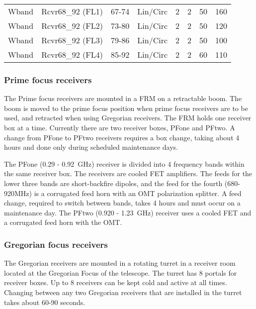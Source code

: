 \begin{table}[!h]
\begin{center}
\begin{tabular}{llcccccc}
\gls{Wband} & Rcvr68\_92 (FL1)   & 67-74     & Lin/Circ & 2 & 2 & 50  & 160 \\ 
\gls{Wband} & Rcvr68\_92 (FL2)   & 73-80     & Lin/Circ & 2 & 2 & 50  & 120 \\ 
\gls{Wband} & Rcvr68\_92 (FL3)   & 79-86     & Lin/Circ & 2 & 2 & 50  & 100 \\ 
\gls{Wband} & Rcvr68\_92 (FL4)   & 85-92     & Lin/Circ & 2 & 2 & 60  & 110 \\ 
\bottomrule
\end{tabular}
\end{center}
\end{table}

\subsubsection{Prime focus receivers}

The Prime focus receivers are mounted in a \gls{FRM} on a retractable boom.
The boom is moved to the prime focus position when prime focus receivers are
to be used, and retracted when using Gregorian receivers. The \gls{FRM} holds
one receiver box at a time.  Currently there are two receiver boxes, \gls{PFone}
and \gls{PFtwo}.  A change from \gls{PFone} to \gls{PFtwo} receivers requires
a box change, taking about 4 hours and done only during scheduled maintenance days. 

The \gls{PFone} (0.29 - 0.92~GHz) receiver is divided into 4 frequency bands
within the same receiver box. The receivers are cooled \gls{FET} amplifiers.
The feeds for the lower three bands are short-backfire dipoles, and the feed
for the fourth (680-920MHz) is a corrugated feed horn with an \gls{OMT} polarization
splitter. A feed change, required to switch between bands, takes 4 hours and
must occur on a maintenance day. The \gls{PFtwo} (0.920 - 1.23~GHz) receiver 
uses a cooled \gls{FET} and a corrugated feed horn with the \gls{OMT}.

\newpage

\subsubsection{Gregorian focus receivers}

The Gregorian receivers are mounted in a rotating turret in a receiver room 
located at the Gregorian Focus of the telescope. The turret has 8 portals for 
receiver boxes. Up to 8 receivers can be kept cold and active at all times. 
Changing between any two Gregorian receivers that are installed in the turret
takes about 60-90 seconds.

